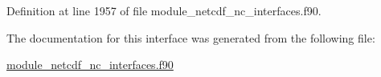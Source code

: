 Definition at line 1957 of file module\+\_\+netcdf\+\_\+nc\+\_\+interfaces.\+f90.



The documentation for this interface was generated from the following file\+:\begin{DoxyCompactItemize}
\item 
\hyperlink{module__netcdf__nc__interfaces_8f90}{module\+\_\+netcdf\+\_\+nc\+\_\+interfaces.\+f90}\end{DoxyCompactItemize}
